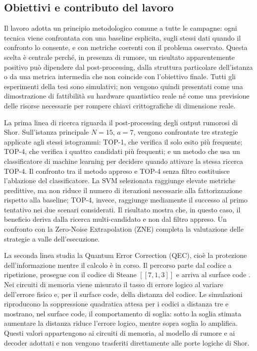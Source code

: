 \begin{onehalfspace}
\section{Obiettivi e contributo del lavoro}

Il lavoro adotta un principio metodologico comune a tutte le campagne: ogni tecnica
viene confrontata con una baseline esplicita, sugli stessi dati quando il confronto lo
consente, e con metriche coerenti con il problema osservato. Questa scelta è centrale
perché, in presenza di rumore, un risultato apparentemente positivo può dipendere dal
post-processing, dalla struttura particolare dell'istanza o da una metrica intermedia
che non coincide con l'obiettivo finale. Tutti gli esperimenti della tesi sono
simulativi; non vengono quindi presentati come una dimostrazione di fattibilità su
hardware quantistico reale né come una previsione delle risorse necessarie per rompere
chiavi crittografiche di dimensione reale.

La prima linea di ricerca riguarda il post-processing degli output rumorosi di Shor.
Sull'istanza principale \(N = 15\), \(a = 7\), vengono confrontate tre strategie applicate agli
stessi istogrammi: TOP-1, che verifica il solo esito più frequente; TOP-4, che verifica
i quattro candidati più frequenti; e un metodo che usa un classificatore di machine
learning per decidere quando attivare la stessa ricerca TOP-4. Il confronto tra il
metodo appreso e TOP-4 senza filtro costituisce l'ablazione del classificatore. La SVM
selezionata raggiunge elevate metriche predittive, ma non riduce il numero di iterazioni
necessarie alla fattorizzazione rispetto alla baseline; TOP-4, invece, raggiunge
mediamente il successo al primo tentativo nei due scenari considerati. Il risultato
mostra che, in questo caso, il beneficio deriva dalla ricerca multi-candidato e non dal
filtro appreso. Un confronto con la Zero-Noise Extrapolation (ZNE) completa la
valutazione delle strategie a valle dell'esecuzione.

La seconda linea studia la Quantum Error Correction (QEC), cioè la protezione
dell'informazione mentre il calcolo è in corso. Il percorso parte dal codice a
ripetizione, prosegue con il codice di Steane \([[7,1,3]]\) e arriva al surface code
\cite{steane1996,fowler2012}. Nei circuiti di memoria viene misurato il tasso di errore logico al variare
dell'errore fisico e, per il surface code, della distanza del codice. Le simulazioni
riproducono la soppressione quadratica attesa per i codici a distanza tre e mostrano,
nel surface code, il comportamento di soglia: sotto la soglia stimata aumentare la
distanza riduce l'errore logico, mentre sopra soglia lo amplifica. Questi valori
appartengono ai circuiti di memoria, al modello di rumore e ai decoder adottati e non
vengono trasferiti direttamente alle porte logiche di Shor.


\end{onehalfspace}
